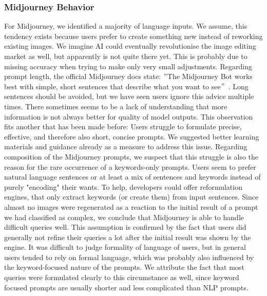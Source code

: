 \subsubsection{Midjourney Behavior}
For Midjourney, we identified a majority of language inputs.
We assume, this tendency exists because users prefer to create something new instead
of reworking existing images.
We imagine AI could eventually revolutionise the image editing market as well, but apparently is
not quite there yet.
This is probably due to missing accuracy when trying to make only very small
adjustments.
Regarding prompt length, the official Midjourney docs state: \("\)The Midjourney Bot works best with
simple, short sentences that describe what you want to see\("\)~\cite{midjourney_documentation_2023}.
Long sentences should be avoided, but we have seen users ignore this advice multiple times.
There sometimes seems to be a lack of understanding that more information is not
always better for quality of model outputs.
This observation fits another that has been made before:
Users struggle to formulate precise, effective, and therefore also short, concise prompts.
We suggested better learning materials and guidance already as a measure to address this issue.
Regarding composition of the Midjourney prompts, we suspect that this struggle is also the reason
for the rare occurrence of a keywords-only prompts.
Users seem to prefer natural language sentences or at least a mix of sentences and keywords
instead of purely "encoding" their wants.
To help, developers could offer reformulation engines, that only extract keywords (or create them)
from input sentences.
Since almost no images were regenerated as a reaction to the initial result of a prompt
we had classified as complex, we conclude that Midjourney is able to handle difficult queries well.
This assumption is confirmed by the fact that users did generally not refine their queries a lot
after the initial result was shown by the engine.
It was difficult to judge formality of language of users, but in general users tended to rely on
formal language, which was probably also influenced by the keyword-focused nature of the prompts.
We attribute the fact that most queries were formulated clearly to this circumstance as well,
since keyword focused prompts are usually shorter and less complicated than NLP prompts.

